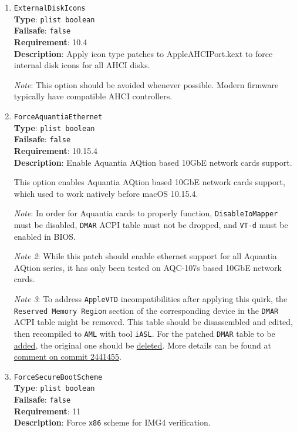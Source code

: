 \documentclass[]{article}
\begin{document}
\begin{enumerate}
\item
  \texttt{ExternalDiskIcons}\\
  \textbf{Type}: \texttt{plist\ boolean}\\
  \textbf{Failsafe}: \texttt{false}\\
  \textbf{Requirement}: 10.4\\
  \textbf{Description}: Apply icon type patches to AppleAHCIPort.kext to force
  internal disk icons for all AHCI disks.

  \emph{Note}: This option should be avoided whenever possible. Modern firmware
  typically have compatible AHCI controllers.

\item
  \texttt{ForceAquantiaEthernet}\\
  \textbf{Type}: \texttt{plist\ boolean}\\
  \textbf{Failsafe}: \texttt{false}\\
  \textbf{Requirement}: 10.15.4\\
  \textbf{Description}: Enable Aquantia AQtion based 10GbE network cards support.

  This option enables Aquantia AQtion based 10GbE network cards support,
  which used to work natively before macOS 10.15.4.

  \emph{Note}: In order for Aquantia cards to properly function,
  \texttt{DisableIoMapper} must be disabled, \texttt{DMAR} ACPI table must not be dropped,
  and \texttt{VT-d} must be enabled in BIOS.

  \emph{Note 2}: While this patch should enable ethernet support for all Aquantia AQtion series,
  it has only been tested on AQC-107s based 10GbE network cards.

  \emph{Note 3}: To address \texttt{AppleVTD} incompatibilities after applying this quirk,
  the \texttt{Reserved Memory Region} section of the corresponding device in the \texttt{DMAR}
  ACPI table might be removed. This table should be disassembled and edited, then recompiled to
  \texttt{AML} with tool \texttt{iASL}. For the patched \texttt{DMAR} table to be \hyperref[acpipropsadd]{added},
  the original one should be \hyperref[acpipropsdelete]{deleted}.
  More details can be found at
  \href{https://github.com/acidanthera/MaxRegnerPkg/commit/24414555f2c07e06a3674ec7a2aa1ce4860bbcc7#commitcomment-70530145}{comment on commit 2441455}.

\item
  \texttt{ForceSecureBootScheme}\\
  \textbf{Type}: \texttt{plist\ boolean}\\
  \textbf{Failsafe}: \texttt{false}\\
  \textbf{Requirement}: 11\\
  \textbf{Description}: Force \texttt{x86} scheme for IMG4 verification.


\end{enumerate}
\end{document}
